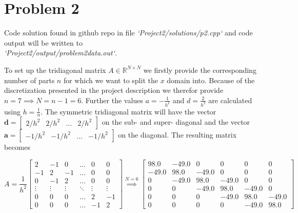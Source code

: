 \documentclass[final, 3p, times, 11.5pt]{article}
\begin{document}
\section{Problem 2}

Code solution found in github repo in file \textit{`Project2/solutions/p2.cpp`} and code output will be written to \\ \textit{`Project2/output/problem2data.out`}. 


To set up the tridiagonal matrix $A \in \mathbb{R}^{N\times N}$ we firstly provide the corresponding number of parts $n$ for which we want to split the $x$ domain into. Because of the discretization presented in the project description we therefor provide $n=7 \implies N = n-1 = 6$. Further the values $a =- \frac{1}{h^{2}}$ and $d = \frac{2}{h^{2}}$ are calculated using $h = \frac{1}{n} $. The symmetric tridiagonal matrix will have the vector $\mathbf{d} = \begin{bmatrix} 2/h^{2} & 2/h^{2} & \dots & 2/h^{2} \end{bmatrix}$ on the sub- and super- diagonal and the vector $\mathbf{a} = \begin{bmatrix} -1/h^{2} & -1/h^{2} & \dots & -1/h^{2} \end{bmatrix}$ on the diagonal. The resulting matrix becomes 

$$
A = \frac{1}{h^{2}}
\begin{bmatrix}
2   &   -1  &   0   &   \dots   &   0   &   0   \\
-1  &   2   &   -1  &   \dots   &   0   &   0   \\
0   &   -1  &   2   &   \dots   &   0   &   0   \\
\vdots & \vdots & \vdots    &\ddots & \vdots & \vdots\\
0   &   0   &   0   &   \dots   &   2 & -1   \\   
0   &   0   &   0   &   \dots   &  -1 & 2 
\end{bmatrix} \stackrel{N=6}{\implies}
\begin{bmatrix}
   98.0 & -49.0 &        0 &        0  &       0  &       0 \\
  -49.0 &  98.0 & -49.0 &        0   &      0  &       0 \\
         0 & -49.0  & 98.0  &-49.0 &        0    &     0 \\
         0 &        0  &-49.0  & 98.0  &-49.0   &      0 \\
         0 &        0  &       0  &-49.0   &98.0  &-49.0 \\
         0 &        0  &       0  &       0  &-49.0 &  98.0
\end{bmatrix}
$$
\end{document}
